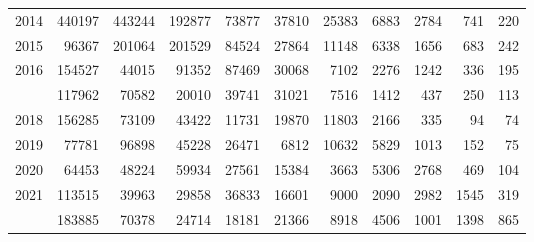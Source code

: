 \documentclass[
]{article}
\begin{document}
\begin{longtable}[t]{lrrrrrrrrrr}
2014 & 440197 & 443244 & 192877 & 73877 & 37810 & 25383 & 6883 & 2784 & 741 & 220\\
2015 & 96367 & 201064 & 201529 & 84524 & 27864 & 11148 & 6338 & 1656 & 683 & 242\\
2016 & 154527 & 44015 & 91352 & 87469 & 30068 & 7102 & 2276 & 1242 & 336 & 195\\
\addlinespace
2017 & 117962 & 70582 & 20010 & 39741 & 31021 & 7516 & 1412 & 437 & 250 & 113\\
2018 & 156285 & 73109 & 43422 & 11731 & 19870 & 11803 & 2166 & 335 & 94 & 74\\
2019 & 77781 & 96898 & 45228 & 26471 & 6812 & 10632 & 5829 & 1013 & 152 & 75\\
2020 & 64453 & 48224 & 59934 & 27561 & 15384 & 3663 & 5306 & 2768 & 469 & 104\\
2021 & 113515 & 39963 & 29858 & 36833 & 16601 & 9000 & 2090 & 2982 & 1545 & 319\\
\addlinespace
2022 & 183885 & 70378 & 24714 & 18181 & 21366 & 8918 & 4506 & 1001 & 1398 & 865\\*
\end{longtable}
\end{document}
